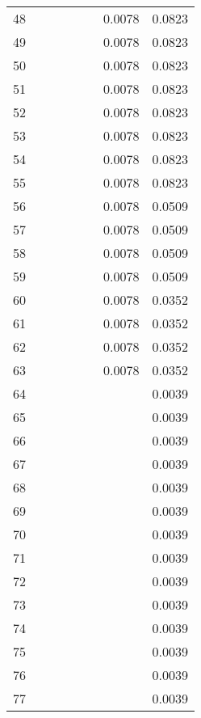 \documentclass[12pt]{article}
\begin{document}
\begin{center}
\begin{longtable}{|c|c|c|c|c|c|c|c|}
            48 &  &  &  &  &  & 0.0078 & 0.0823 \\
            49 &  &  &  &  &  & 0.0078 & 0.0823 \\
            50 &  &  &  &  &  & 0.0078 & 0.0823 \\
            51 &  &  &  &  &  & 0.0078 & 0.0823 \\
            52 &  &  &  &  &  & 0.0078 & 0.0823 \\
            53 &  &  &  &  &  & 0.0078 & 0.0823 \\
            54 &  &  &  &  &  & 0.0078 & 0.0823 \\
            55 &  &  &  &  &  & 0.0078 & 0.0823 \\
            56 &  &  &  &  &  & 0.0078 & 0.0509 \\
            57 &  &  &  &  &  & 0.0078 & 0.0509 \\
            58 &  &  &  &  &  & 0.0078 & 0.0509 \\
            59 &  &  &  &  &  & 0.0078 & 0.0509 \\
            60 &  &  &  &  &  & 0.0078 & 0.0352 \\
            61 &  &  &  &  &  & 0.0078 & 0.0352 \\
            62 &  &  &  &  &  & 0.0078 & 0.0352 \\
            63 &  &  &  &  &  & 0.0078 & 0.0352 \\
            64 &  &  &  &  &  &  & 0.0039 \\
            65 &  &  &  &  &  &  & 0.0039 \\
            66 &  &  &  &  &  &  & 0.0039 \\
            67 &  &  &  &  &  &  & 0.0039 \\
            68 &  &  &  &  &  &  & 0.0039 \\
            69 &  &  &  &  &  &  & 0.0039 \\
            70 &  &  &  &  &  &  & 0.0039 \\
            71 &  &  &  &  &  &  & 0.0039 \\
            72 &  &  &  &  &  &  & 0.0039 \\
            73 &  &  &  &  &  &  & 0.0039 \\
            74 &  &  &  &  &  &  & 0.0039 \\
            75 &  &  &  &  &  &  & 0.0039 \\
            76 &  &  &  &  &  &  & 0.0039 \\
            77 &  &  &  &  &  &  & 0.0039 \\

\end{longtable}
\end{center}
\end{document}

